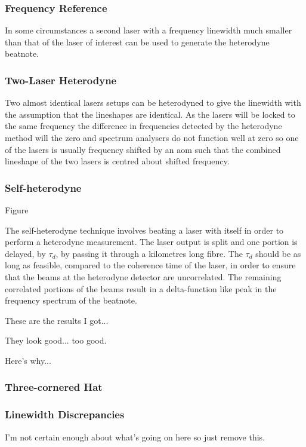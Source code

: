 \subsubsection{Frequency Reference}

In some circumstances a second laser with a frequency linewidth much smaller than that of the laser of interest can be used to generate the heterodyne beatnote.

\subsubsection{Two-Laser Heterodyne}

Two almost identical lasers setups can be heterodyned to give the linewidth with the assumption that the lineshapes are identical.
As the lasers will be locked to the same frequency the difference in frequencies detected by the heterodyne method will the zero and spectrum analysers do not function well at zero so one of the lasers is usually frequency shifted by an \gls{aom} such that the combined lineshape of the two lasers is centred about shifted frequency.

\subsubsection{Self-heterodyne}
{\color{red}Figure}

The self-heterodyne technique involves beating a laser with itself in order to perform a heterodyne measurement\cite{okoshi_novel_1980, richter_linewidth_1986}.
The laser output is split and one portion is delayed, by $\tau_d$, by passing it through a kilometres long fibre.
The $\tau_d$ should be as long as feasible, compared to the coherence time of the laser, in order to ensure that the beams at the heterodyne detector are uncorrelated.
The remaining correlated portions of the beams result in a delta-function like peak in the frequency spectrum of the beatnote.

These are the results I got...

They look good... too good.

Here's why...\cite{richter_linewidth_1986}

\subsubsection{Three-cornered Hat}

\subsubsection{Linewidth Discrepancies}
{\color{red}I'm not certain enough about what's going on here so just remove this.}

